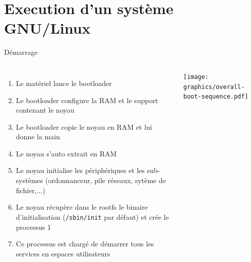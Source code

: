 \section{Execution d'un système GNU/Linux}

\begin{frame}{Démarrage}
  \begin{columns}
    \begin{enumerate}
    \item Le matériel lance le bootloader
    \item Le bootloader configure la RAM et le support contenant le noyau
    \item Le bootloader copie le noyau en RAM et lui donne la main
    \item Le noyau s'auto extrait en RAM
    \item Le noyau initialise les périphériques et les sub-systèmes (ordonnanceur, pile réseaux, sytème de fichier,...)
    \item Le noyau récupère dans le rootfs le binaire d'initialisation (\texttt{/sbin/init} par défaut) et crée le processus 1
    \item Ce processus est chargé de démarrer tous les services en espaces utilisateurs
    \end{enumerate}
    \begin{center}
      \texttt{[image: graphics/overall-boot-sequence.pdf]}
    \end{center}
  \end{columns}
\end{frame}

